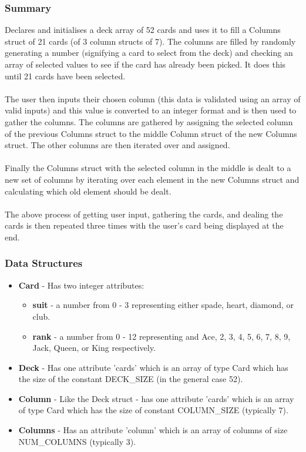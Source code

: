 \documentclass[11]{article}
\begin{document}
			\subsubsection{Summary}
			Declares and initialises a deck array of 52 cards and uses it to fill a Columns struct of 21 cards (of 3 column structs of 7). The columns are filled by randomly generating a number (signifying a card to select from the deck) and checking an array of selected values to see if the card has already been picked. It does this until 21 cards have been selected. \\\\The user then inputs their chosen column (this data is validated using an array of valid inputs) and this value is converted to an integer format and is then used to gather the columns. The columns are gathered by assigning the selected column of the previous Columns struct to the middle Column struct of the new Columns struct. The other columns are then iterated over and assigned. \\\\Finally the Columns struct with the selected column in the middle is dealt to a new set of columns by iterating over each element in the new Columns struct and calculating which old element should be dealt. \\\\The above process of getting user input, gathering the cards, and dealing the cards is then repeated three times with the user's card being displayed at the end.
			\subsubsection{Data Structures}
				\begin{itemize}
					\item \textbf{Card} - Has two integer attributes:
						\begin{itemize}
							\item \textbf{suit} - a number from 0 - 3 representing either spade, heart, diamond, or club.
							\item \textbf{rank} - a number from 0 - 12 representing and Ace, 2, 3, 4, 5, 6, 7, 8, 9, Jack, Queen, or King respectively.
						\end{itemize}
					
					\item \textbf{Deck} - Has one attribute 'cards' which is an array of type Card which has the size of the constant DECK\_SIZE (in the general case 52).
					
					\item \textbf{Column} - Like the Deck struct - has one attribute 'cards' which is an array of type Card which has the size of constant COLUMN\_SIZE (typically 7).
					
					\item \textbf{Columns} - Has an attribute 'column' which is an array of columns of size NUM\_COLUMNS (typically 3).
				\end{itemize}
\end{document}

